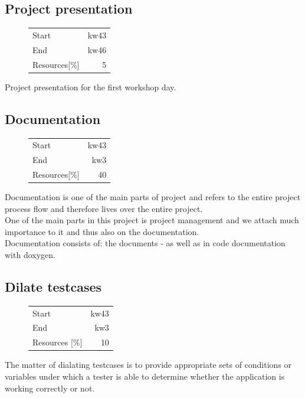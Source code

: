 \subsection{Project presentation}
\begin{figure}
\begin{tabular}[t]{|lr|}
\hline
Start & kw43\\
End & kw46\\
Resources[\%] & 5\\
\hline
\end{tabular}
\end{figure}
Project presentation for the first workshop day.


\subsection{Documentation}
\begin{figure}
\begin{tabular}[t]{|lr|}
\hline
Start & kw43\\
End & kw3\\
Resources[\%] & 40\\
\hline
\end{tabular}
\end{figure}
Documentation is one of the main parts of project and refers to the entire project 
process flow and therefore lives over the entire project.\\
One of the main parts in this project is project management and we attach much 
importance to it and thus also on the documentation.\\

Documentation consists of: the documents \cite [NESD1]{NESD1} - \cite [NESD5]{NESD5} 
as well as in code documentation with doxygen.

\subsection{Dilate testcases}
\begin{figure}
\begin{tabular}[t]{|lr|}
\hline
Start & kw43\\
End & kw3\\
Resources [\%] & 10\\
\hline
\end{tabular}
\end{figure}
The matter of dialating testcases is to provide appropriate sets of conditions or variables under which
a tester is able to determine whether the application is working correctly or not.

